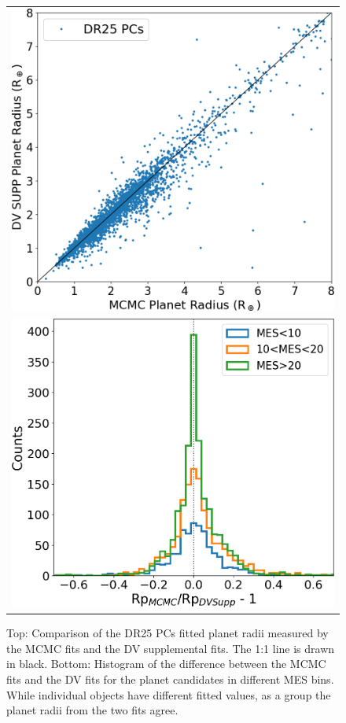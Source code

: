 \begin{figure}[htb]
\centering
\begin{tabular}{c}
\includegraphics[width=\linewidth]{fig-comparePradius-mcmcSup-trimmed.png} \\[2em]
\includegraphics[width=\linewidth]{fig-comparePradius-histogram-trimmed.png}
\end{tabular}
\caption{Top: Comparison of the DR25 PCs fitted planet radii measured by the MCMC fits and the DV supplemental fits. The 1:1 line is drawn in black. Bottom: Histogram of the difference between the MCMC fits and the DV fits for the planet candidates in different MES bins. While individual objects have different fitted values, as a group the planet radii from the two fits agree. }
\label{f:mcmcsupp}
\end{figure}


